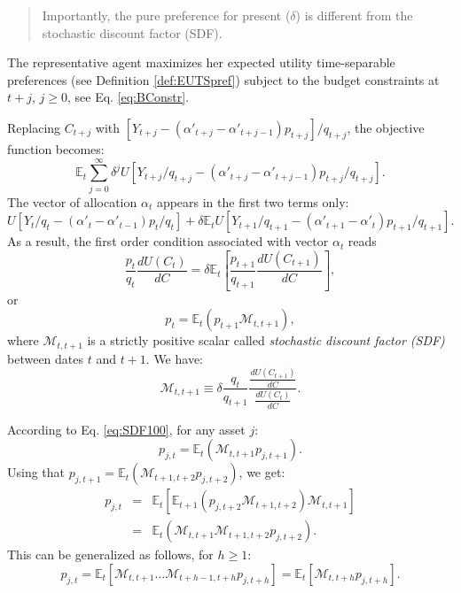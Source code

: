 \documentclass[
  12pt,
]{book}
\theoremstyle{definition}
\theoremstyle{definition}
\theoremstyle{definition}
\theoremstyle{definition}
\theoremstyle{remark}
\begin{document}
\begin{quote}
Importantly, the pure preference for present (\(\delta\)) is different from the stochastic discount factor (SDF).
\end{quote}

The representative agent maximizes her expected utility time-separable preferences (see Definition \ref{def:EUTSpref}) subject to the budget constraints at \(t+j\), \(j \ge 0\), see Eq. \eqref{eq:BConstr}.

Replacing \(C_{t+j}\) with \([Y_{t+j}-(\alpha'_{t+j}-\alpha'_{t+j-1})p_{t+j}]/q_{t+j}\), the objective function becomes:
\[
\mathbb{E}_t  \sum^\infty_{j=0} \delta^j U
[Y_{t+j}/q_{t+j}-(\alpha'_{t+j}-\alpha'_{t+j-1})p_{t+j}/q_{t+j}].
\]
The vector of allocation \(\alpha_t\) appears in the first two terms only:
\[
U[Y_t/q_t-(\alpha'_t-\alpha'_{t-1})p_t/q_t] + \delta \mathbb{E}_t
U[Y_{t+1}/q_{t+1}-(\alpha'_{t+1}-\alpha'_t)p_{t+1}/q_{t+1}].
\]
As a result, the first order condition associated with vector \(\alpha_t\) reads
\[
\frac{p_t}{q_t}  \frac{d U(C_t)}{dC} = \delta \mathbb{E}_t \left[
\frac{p_{t+1}}{q_{t+1}}  \frac{dU(C_{t+1})}{dC}
\right],
\]
or
\begin{equation}
p_t = \mathbb{E}_t(p_{t+1} \mathcal{M}_{t,t+1}),\label{eq:SDF100}
\end{equation}
where \(\mathcal{M}_{t,t+1}\) is a strictly positive scalar called \emph{stochastic discount factor (SDF)} between dates \(t\) and \(t+1\). We have:
\begin{equation}
\mathcal{M}_{t,t+1} \equiv \delta  \frac{q_t}{q_{t+1}}
\frac{  \frac{dU(C_{t+1})}{dC}} {
\frac{dU(C_t)}{dC}}.\label{eq:SDFCCAPM}
\end{equation}

According to Eq. \eqref{eq:SDF100}, for any asset \(j\):
\begin{equation}
p_{j,t} = \mathbb{E}_t(\mathcal{M}_{t,t+1} p_{j,t+1}).\label{eq:Mbasicpricing}
\end{equation}
Using that \(p_{j,t+1} = \mathbb{E}_t(\mathcal{M}_{t+1,t+2} p_{j,t+2})\), we get:
\begin{eqnarray*}
p_{j,t} &=& \mathbb{E}_t[\mathbb{E}_{t+1}(p_{j,t+2}\mathcal{M}_{t+1,t+2})\mathcal{M}_{t,t+1}] \\
&=& \mathbb{E}_t(\mathcal{M}_{t,t+1} \mathcal{M}_{t+1,t+2}p_{j,t+2}).
\end{eqnarray*}
This can be generalized as follows, for \(h \ge 1\):
\[
p_{j,t} = \mathbb{E}_t[\mathcal{M}_{t,t+1} \dots \mathcal{M}_{t+h-1,t+h}p_{j,t+h}] = \mathbb{E}_t[\mathcal{M}_{t,t+h}p_{j,t+h}].
\]
\end{document}

